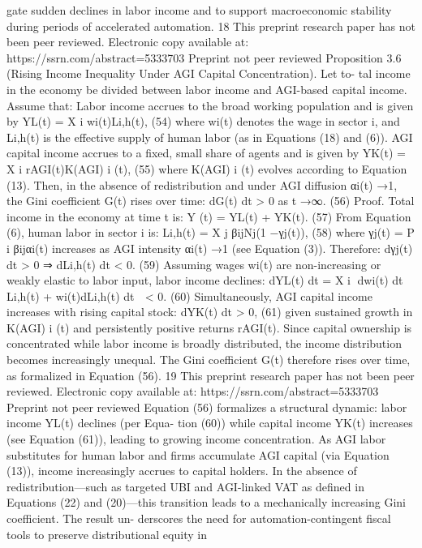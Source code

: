 gate sudden declines in labor income and to support macroeconomic stability during periods
of accelerated automation.
18
This preprint research paper has not been peer reviewed. Electronic copy available at: https://ssrn.com/abstract=5333703
Preprint not peer reviewed
Proposition 3.6 (Rising Income Inequality Under AGI Capital Concentration). Let to-
tal income in the economy be divided between labor income and AGI-based capital income.
Assume that:
Labor income accrues to the broad working population and is given by
YL(t) =
X
i
wi(t)Li,h(t),
(54)
where wi(t) denotes the wage in sector i, and Li,h(t) is the effective supply of human labor
(as in Equations (18) and (6)).
AGI capital income accrues to a fixed, small share of agents and is given by
YK(t) =
X
i
rAGI(t)K(AGI)
i
(t),
(55)
where K(AGI)
i
(t) evolves according to Equation (13).
Then, in the absence of redistribution and under AGI diffusion αi(t) →1, the Gini
coefficient G(t) rises over time:
dG(t)
dt
> 0
as t →∞.
(56)
Proof. Total income in the economy at time t is:
Y (t) = YL(t) + YK(t).
(57)
From Equation (6), human labor in sector i is:
Li,h(t) =
X
j
βijNj(1 −γj(t)),
(58)
where γj(t) = P
i βijαi(t) increases as AGI intensity αi(t) →1 (see Equation (3)). Therefore:
dγj(t)
dt
> 0
⇒
dLi,h(t)
dt
< 0.
(59)
Assuming wages wi(t) are non-increasing or weakly elastic to labor input, labor income
declines:
dYL(t)
dt
=
X
i
dwi(t)
dt
Li,h(t) + wi(t)dLi,h(t)
dt

< 0.
(60)
Simultaneously, AGI capital income increases with rising capital stock:
dYK(t)
dt
> 0,
(61)
given sustained growth in K(AGI)
i
(t) and persistently positive returns rAGI(t).
Since capital ownership is concentrated while labor income is broadly distributed, the
income distribution becomes increasingly unequal. The Gini coefficient G(t) therefore rises
over time, as formalized in Equation (56).
19
This preprint research paper has not been peer reviewed. Electronic copy available at: https://ssrn.com/abstract=5333703
Preprint not peer reviewed
Equation (56) formalizes a structural dynamic: labor income YL(t) declines (per Equa-
tion (60)) while capital income YK(t) increases (see Equation (61)), leading to growing
income concentration. As AGI labor substitutes for human labor and firms accumulate AGI
capital (via Equation (13)), income increasingly accrues to capital holders. In the absence
of redistribution—such as targeted UBI and AGI-linked VAT as defined in Equations (22)
and (20)—this transition leads to a mechanically increasing Gini coefficient. The result un-
derscores the need for automation-contingent fiscal tools to preserve distributional equity in
